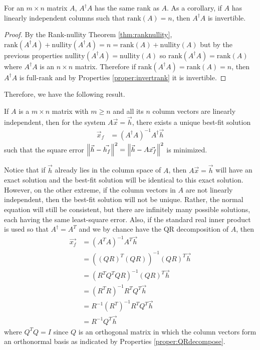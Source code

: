 \begin{proper}
\label{proper:AdagArank}
For an $m \times n$ matrix $A$, $A^\dag A$ has the same rank as $A$. As a corollary, if $A$ has linearly independent columns such that $\text{rank}(A) = n$, then $A^\dag A$ is invertible.
\end{proper}
\begin{proof}
By the Rank-nullity Theorem \ref{thm:ranknullity}, $\text{rank}(A^\dag A) + \text{nullity}(A^\dag A) = n = \text{rank}(A) + \text{nullity}(A)$ but by the previous properties $\text{nullity}(A^\dag A) = \text{nullity}(A)$ so $\text{rank}(A^\dag A) = \text{rank}(A)$ where $A^\dag A$ is an $n \times n$ matrix. Therefore if $\text{rank}(A^\dag A) = \text{rank}(A) = n$, then $A^\dag A$ is full-rank and by Properties \ref{proper:invertrank} it is invertible.
\end{proof}
Therefore, we have the following result.
\begin{thm}
\label{thm:bestfit}
If $A$ is a $m \times n$ matrix with $m \geq n$ and all its $n$ column vectors are linearly independent, then for the system $A\vec{x} = \vec{h}$, there exists a unique best-fit solution
\begin{align*}
\vec{x}_f &= (A^\dag A)^{-1}A^\dag \vec{h}
\end{align*}
such that the square error $\norm{\vec{h}-\vec{h_f}}^2 = \norm{\vec{h}-A\vec{x_f}}^2$ is minimized.
\end{thm}
Notice that if $\vec{h}$ already lies in the column space of $A$, then $A\vec{x} = \vec{h}$ will have an exact solution and the best-fit solution will be identical to this exact solution. However, on the other extreme, if the column vectors in $A$ are not linearly independent, then the best-fit solution will not be unique. Rather, the normal equation will still be consistent, but there are infinitely many possible solutions, each having the same least-square error. Also, if the standard real inner product is used so that $A^\dag = A^T$ and we by chance have the QR decomposition of $A$, then
\begin{align*}
\vec{x_f} &= (A^TA)^{-1}A^T\vec{h} \\
&= ((QR)^T(QR))^{-1}(QR)^T\vec{h} \\
&= (R^TQ^TQR)^{-1} (QR)^T\vec{h} \\
&= (R^TR)^{-1} R^TQ^T \vec{h} \\
&= R^{-1} (R^T)^{-1} R^TQ^T \vec{h} \\
&= R^{-1} Q^T\vec{h}
\end{align*}
where $Q^TQ = I$ since $Q$ is an orthogonal matrix in which the column vectors form an orthonormal basis as indicated by Properties \ref{proper:QRdecompose}.

